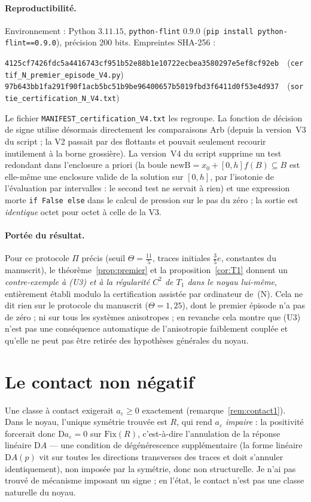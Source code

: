 \documentclass[11pt,a4paper]{article}
\theoremstyle{remark}
\newcommand{\D}{\mathrm D}
\begin{document}
\paragraph{Reproductibilité.} Environnement : Python $3.11.15$, \texttt{python-flint} $0.9.0$ (\texttt{pip install python-flint==0.9.0}), précision $200$ bits. Empreintes SHA-256 :
\begin{center}\footnotesize
\texttt{4125cf7426fdc5a4416743cf951b52e88b1e10722ecbea3580297e5ef8cf92eb}\ \ (\texttt{certif\_N\_premier\_episode\_V4.py})\\
\texttt{97b643bb1fa291f90f1acb5bc51b9be96400657b5019fbd3f6411d0f53e4d937}\ \ (\texttt{sortie\_certification\_N\_V4.txt})
\end{center}
Le fichier \texttt{MANIFEST\_certification\_V4.txt} les regroupe. La fonction de décision de signe utilise désormais directement les comparaisons Arb (depuis la version~V3 du script ; la V2 passait par des flottants et pouvait seulement recourir inutilement à la borne grossière). La version~V4 du script supprime un test redondant dans l'enclosure a priori (la boule $\mathrm{newB}=x_0+[0,h]f(B)\subseteq B$ est elle-même une enclosure valide de la solution sur $[0,h]$, par l'isotonie de l'évaluation par intervalles : le second test ne servait à rien) et une expression morte \texttt{if False else} dans le calcul de pression sur le pas du zéro ; la sortie est \emph{identique} octet pour octet à celle de la V3.

\paragraph{Portée du résultat.} Pour ce protocole $\Pi$ précis (seuil $\Theta=\frac{11}5$, traces initiales $\frac35e$, constantes du manuscrit), le théorème~\ref{prop:premier} et la proposition~\ref{cor:T1} donnent un \emph{contre-exemple à (U3) et à la régularité $C^2$ de $T_1$ dans le noyau lui-même}, entièrement établi modulo la certification assistée par ordinateur de~(N). Cela ne dit rien sur le protocole du manuscrit ($\Theta=1{,}25$), dont le premier épisode n'a pas de zéro ; ni sur tous les systèmes anisotropes ; en revanche cela montre que (U3) n'est pas une conséquence automatique de l'anisotropie faiblement couplée et qu'elle ne peut pas être retirée des hypothèses générales du noyau.

\section{Le contact non négatif}\label{sec:contact}
Une classe à contact exigerait $a_\varepsilon\ge0$ exactement (remarque~\ref{rem:contact1}). Dans le noyau, l'unique symétrie trouvée est $R$, qui rend $a_\varepsilon$ \emph{impaire} : la positivité forcerait donc $\D a_\varepsilon=0$ sur $\mathrm{Fix}(R)$, c'est-à-dire l'annulation de la réponse linéaire $\D A$ --- une condition de dégénérescence supplémentaire (la forme linéaire $\D A(p)$ vit sur toutes les directions transverses des traces et doit s'annuler identiquement), non imposée par la symétrie, donc non structurelle. Je n'ai pas trouvé de mécanisme imposant un signe ; en l'état, le contact n'est pas une classe naturelle du noyau.
\end{document}
